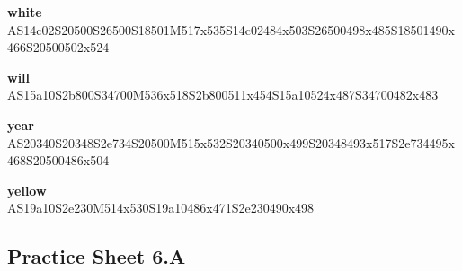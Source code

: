 \documentclass{article}
\begin{document}
\begin{glossary}
\textbf{white}\\
AS14c02S20500S26500S18501M517x535S14c02484x503S26500498x485S18501490x466S20500502x524

\textbf{will}\\
AS15a10S2b800S34700M536x518S2b800511x454S15a10524x487S34700482x483

\textbf{year}\\
AS20340S20348S2e734S20500M515x532S20340500x499S20348493x517S2e734495x468S20500486x504

\textbf{yellow}\\
AS19a10S2e230M514x530S19a10486x471S2e230490x498

\end{glossary}

\subsection{Practice Sheet 6.A}
\end{document}

